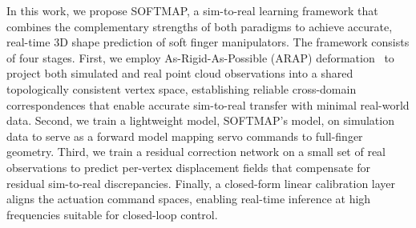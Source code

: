 \documentclass[letterpaper, 10 pt, conference]{ieeeconf}  %
\newcommand{\algname}{SOFTMAP\xspace}
\begin{document}
In this work, we propose \algname, a sim-to-real learning framework that combines the complementary strengths of both paradigms to achieve accurate, real-time 3D shape prediction of soft finger manipulators. %
The framework consists of four stages. First, we employ As-Rigid-As-Possible (ARAP) deformation~\cite{sorkine2007rigid, yoo2024ropotter} to project both simulated and real point cloud observations into a shared topologically consistent vertex space, establishing reliable cross-domain correspondences that enable accurate sim-to-real transfer with minimal real-world data. Second, we train a lightweight model, \algname's model, on simulation data to serve as a forward model mapping servo commands to full-finger geometry. Third, we train a residual correction network on a small set of real observations to predict per-vertex displacement fields that compensate for residual sim-to-real discrepancies. Finally, a closed-form linear calibration layer aligns the actuation command spaces, enabling real-time inference at high frequencies suitable for closed-loop control.
\end{document}
